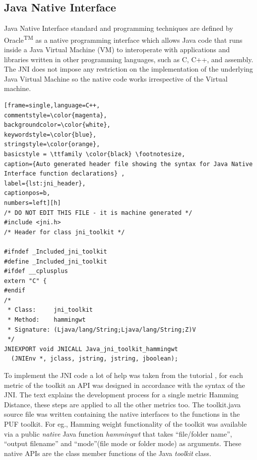 \subsection{Java Native Interface}
Java Native Interface standard and programming techniques are defined by Oracle\textsuperscript{TM} as a native programming interface which allows Java code that runs inside a Java Virtual Machine (VM) to interoperate with applications and libraries written in other programming languages, such as C, C++, and assembly. The JNI does not impose any restriction on the implementation of the underlying Java Virtual Machine so the native code works irrespective of the Virtual machine.\\

\begin{lstlisting}[frame=single,language=C++,
commentstyle=\color{magenta},
backgroundcolor=\color{white},
keywordstyle=\color{blue},
stringstyle=\color{orange},
basicstyle = \ttfamily \color{black} \footnotesize,
caption={Auto generated header file showing the syntax for Java Native Interface function declarations} ,
label={lst:jni_header},
captionpos=b,
numbers=left][h]
/* DO NOT EDIT THIS FILE - it is machine generated */
#include <jni.h>
/* Header for class jni_toolkit */

#ifndef _Included_jni_toolkit
#define _Included_jni_toolkit
#ifdef __cplusplus
extern "C" {
#endif
/*
 * Class:     jni_toolkit
 * Method:    hammingwt
 * Signature: (Ljava/lang/String;Ljava/lang/String;Z)V
 */
JNIEXPORT void JNICALL Java_jni_toolkit_hammingwt
  (JNIEnv *, jclass, jstring, jstring, jboolean);
\end{lstlisting}
\vspace*{1\baselineskip}

To implement the JNI code a lot of help was taken from the tutorial \cite{jni_tutorial}, for each metric of the toolkit an API was designed in accordance with the syntax of the JNI. The text explains the development process for a single metric Hamming Distance, these steps are applied to all the other metrics too. The toolkit.java source file was written containing the native interfaces to the functions in the PUF toolkit. For eg., Hamming weight functionality of the toolkit was available via a
public \emph{native} Java function \emph{hammingwt} that takes ``file/folder name'', ``output filename'' and ``mode''(file mode or folder mode) as arguments.  These native APIs are the class member functions of the Java \emph{toolkit} class.\\

